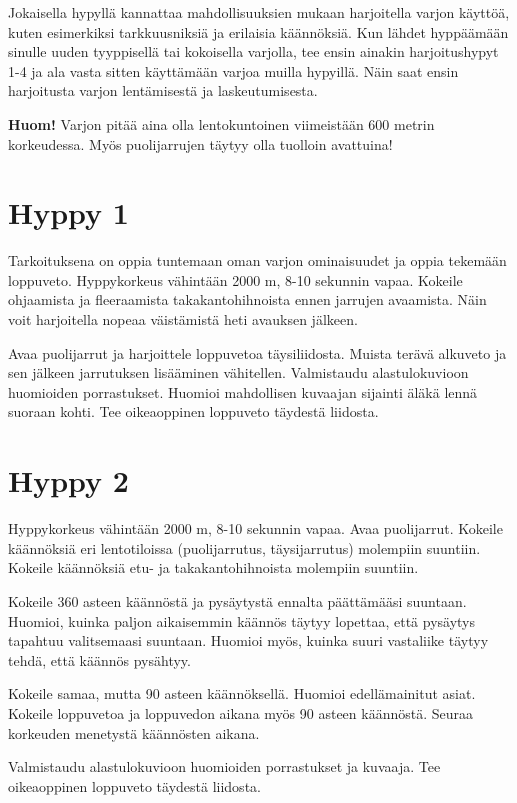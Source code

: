 
Jokaisella hypyllä kannattaa mahdollisuuksien mukaan harjoitella varjon käyttöä, kuten esimerkiksi tarkkuusniksiä ja erilaisia käännöksiä. Kun lähdet hyppäämään sinulle uuden tyyppisellä tai kokoisella varjolla, tee ensin ainakin harjoitushypyt 1-4 ja ala vasta sitten käyttämään varjoa muilla hypyillä. Näin saat ensin harjoitusta varjon lentämisestä ja laskeutumisesta.  


\textbf{Huom!} Varjon pitää aina olla lentokuntoinen viimeistään 600 metrin korkeudessa. Myös puolijarrujen täytyy olla tuolloin avattuina! 

\section{ Hyppy 1 }
\label{kuvunkasittelyharjoitukset-hyppy-1}


Tarkoituksena on oppia tuntemaan oman varjon ominaisuudet ja oppia tekemään loppuveto. Hyppykorkeus vähintään 2000 m, 8-10 sekunnin vapaa. Kokeile ohjaamista ja fleeraamista takakantohihnoista ennen jarrujen avaamista. Näin voit harjoitella nopeaa väistämistä heti avauksen jälkeen. 


Avaa puolijarrut ja harjoittele loppuvetoa täysiliidosta. Muista terävä alkuveto ja sen jälkeen jarrutuksen lisääminen vähitellen. Valmistaudu alastulokuvioon huomioiden porrastukset. Huomioi mahdollisen kuvaajan sijainti äläkä lennä suoraan kohti. Tee oikeaoppinen loppuveto täydestä liidosta. 

\section{ Hyppy 2 }
\label{kuvunkasittelyharjoitukset-hyppy-2}


Hyppykorkeus vähintään 2000 m, 8-10 sekunnin vapaa. Avaa puolijarrut. Kokeile käännöksiä eri lentotiloissa (puolijarrutus, täysijarrutus) molempiin suuntiin. Kokeile käännöksiä etu- ja takakantohihnoista molempiin suuntiin.  


Kokeile 360 asteen käännöstä ja pysäytystä ennalta päättämääsi suuntaan. Huomioi, kuinka paljon aikaisemmin käännös täytyy lopettaa, että pysäytys tapahtuu valitsemaasi suuntaan. Huomioi myös, kuinka suuri vastaliike täytyy tehdä, että käännös pysähtyy. 


Kokeile samaa, mutta 90 asteen käännöksellä. Huomioi edellämainitut asiat. Kokeile loppuvetoa ja loppuvedon aikana myös 90 asteen käännöstä. Seuraa korkeuden menetystä käännösten aikana. 


Valmistaudu alastulokuvioon huomioiden porrastukset ja kuvaaja. Tee oikeaoppinen loppuveto täydestä liidosta. 

